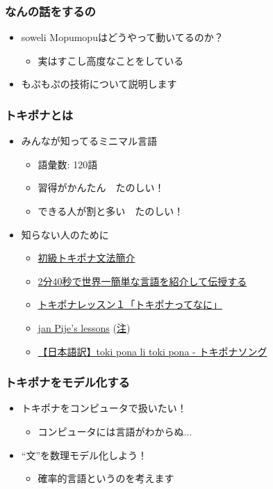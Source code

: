 \documentclass[14pt]{beamer}
\begin{document}
\begin{frame}
	\frametitle{なんの話をするの}

	\begin{itemize}
		\item soweli Mopumopuはどうやって動いてるのか？
			\begin{itemize}
				\item 実はすこし高度なことをしている
			\end{itemize}
		\item もぷもぷの技術について説明します
	\end{itemize}
\end{frame}

\begin{frame}
	\frametitle{トキポナとは}

	\begin{itemize}
		\item みんなが知ってるミニマル言語
			\begin{itemize}
				\item 語彙数: 120語
				\item 習得がかんたん　たのしい！
				\item できる人が割と多い　たのしい！
			\end{itemize}
		\item 知らない人のために
			\begin{itemize}
				\item \href{https://twitter.com/notolytos/status/1409484535151042568}{\small 初級トキポナ文法簡介}
				\item \href{https://www.youtube.com/watch?v=9C0YqTs4vB8}{\small 2分40秒で世界一簡単な言語を紹介して伝授する}
				\item \href{https://www.youtube.com/watch?v=wIFJfAhiPlE}{\small トキポナレッスン１「トキポナってなに」}
				\item \href{https://en.wikibooks.org/wiki/Updated\_jan\_Pije\%27s\_lessons}{\small jan Pije's lessons} 
					{\scriptsize (\href{https://github.com/stefichjo/toki-pona/blob/master/pije.md}{注})}
				\item \href{https://www.youtube.com/watch?v=2jRtYBaZGgQ}{\small 【日本語訳】toki pona li toki pona - トキポナソング}
			\end{itemize}
	\end{itemize}
\end{frame}

\begin{frame}
	\frametitle{トキポナをモデル化する}

	\begin{itemize}
		\item トキポナをコンピュータで扱いたい！
			\begin{itemize}
				\item コンピュータには言語がわからぬ...
			\end{itemize}
		\item ``文''を数理モデル化しよう！
			\begin{itemize}
				\item 確率的言語というのを考えます
			\end{itemize}
	\end{itemize}
\end{frame}
\end{document}
